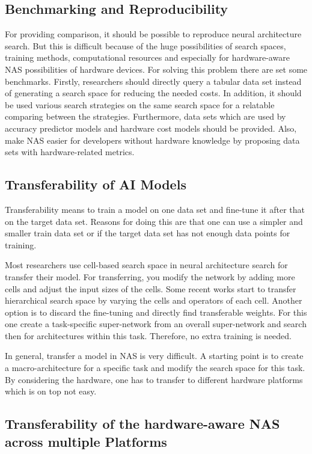 \documentclass[conference]{IEEEtran}
\begin{document}
\subsection{Benchmarking and Reproducibility}

For providing comparison, it should be possible to reproduce neural architecture search. But this is difficult because of the huge possibilities of search spaces, training methods, computational resources and especially for hardware-aware NAS possibilities of hardware devices. For solving this problem there are set some benchmarks. Firstly, researchers should directly query a tabular data set instead of generating a search space for reducing the needed costs. In addition, it should be used various search strategies on the same search space for a relatable comparing between the strategies. Furthermore, data sets which are used by accuracy predictor models and hardware cost models should be provided. Also, make NAS easier for developers without hardware knowledge by proposing data sets with hardware-related metrics.

\subsection{Transferability of AI Models}

Transferability means to train a model on one data set and fine-tune it after that on the target data set. Reasons for doing this are that one can use a simpler and smaller train data set or if the target data set has not enough data points for training. 

Most researchers use cell-based search space in neural architecture search for transfer their model. For transferring, you modify the network by adding more cells and adjust the input sizes of the cells. Some recent works start to transfer hierarchical search space by varying the cells and operators of each cell. Another option is to discard the fine-tuning and directly find transferable weights. For this one create a task-specific super-network from an overall super-network and search then for architectures within this task. Therefore, no extra training is needed. 

In general, transfer a model in NAS is very difficult. A starting point is to create a macro-architecture for a specific task and modify the search space for this task. By considering the hardware, one has to transfer to different hardware platforms which is on top not easy. 
 
\subsection{Transferability of the hardware-aware NAS across multiple Platforms}
\end{document}
